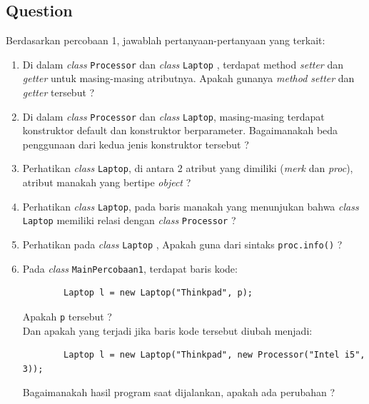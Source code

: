\documentclass[12pt,titlepage]{article}
\begin{document}
\newpage
\subsection{Question}
Berdasarkan percobaan 1, jawablah pertanyaan-pertanyaan yang terkait:
\begin{enumerate}
    \item Di dalam \textit{class} \texttt{Processor} dan \textit{class} \texttt{Laptop} , terdapat method \textit{setter} dan \textit{getter} untuk masing-masing atributnya. Apakah gunanya \textit{method setter} dan \textit{getter} tersebut ?
    \item Di dalam \textit{class} \texttt{Processor} dan \textit{class} \texttt{Laptop}, masing-masing terdapat konstruktor default dan konstruktor berparameter. Bagaimanakah beda penggunaan dari kedua jenis konstruktor tersebut ?
    \item Perhatikan \textit{class} \texttt{Laptop}, di antara 2 atribut yang dimiliki (\textit{merk} dan \textit{proc}), atribut manakah yang bertipe \textit{object} ?
    \item Perhatikan \textit{class} \texttt{Laptop}, pada baris manakah yang menunjukan bahwa \textit{class} \texttt{Laptop} memiliki relasi dengan \textit{class} \texttt{Processor} ?
    \item Perhatikan pada \textit{class} \texttt{Laptop} , Apakah guna dari sintaks \texttt{proc.info()} ?
    \item Pada \textit{class} \texttt{MainPercobaan1}, terdapat baris kode:
    \begin{verbatim}
        Laptop l = new Laptop("Thinkpad", p);
    \end{verbatim}
    Apakah \texttt{p} tersebut ?\\
    Dan apakah yang terjadi jika baris kode tersebut diubah menjadi:
    \begin{verbatim}
        Laptop l = new Laptop("Thinkpad", new Processor("Intel i5", 3));
    \end{verbatim}
    Bagaimanakah hasil program saat dijalankan, apakah ada perubahan ?
\end{enumerate}

\newpage
\end{document}

